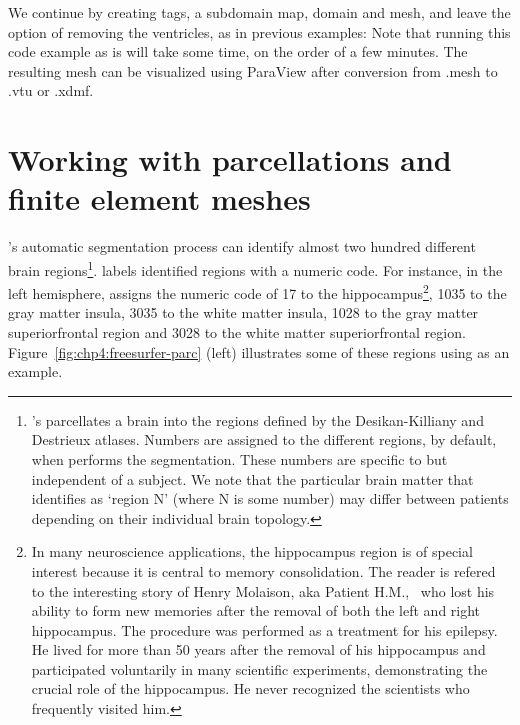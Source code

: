 We continue by creating tags, a subdomain map, domain and mesh, and
leave the option of removing the ventricles, as in previous examples:
 Note that
running this code example as is will take some time, on the order of a
few minutes. The resulting mesh can be visualized using ParaView
after conversion from .mesh to .vtu or .xdmf.

\section{Working with parcellations and finite element meshes} 
\label{sec:import-freesurfer-parcellation}
{\freesurfer}'s  automatic segmentation process can identify 
almost two hundred different brain regions\footnote{{\freesurfer}'s  parcellates a brain into the regions 
defined by the Desikan-Killiany and Destrieux atlases.  Numbers are assigned 
to the different regions, by default, when \freesurfer{} performs the 
segmentation. These numbers are specific to \freesurfer{} but independent of a 
subject.  We note that the particular brain matter that \freesurfer{} 
identifies as `region N' (where N is some number) may differ between patients 
depending on their individual brain topology.}.  {\freesurfer} labels 
identified regions with a numeric code.  For instance, in the left 
hemisphere, \freesurfer{} assigns the numeric code of 17 to the 
hippocampus\footnote{In many
  neuroscience applications, the hippocampus region is of special
  interest because it is central to memory consolidation. The reader
  is refered to the interesting story of Henry Molaison, aka Patient
  H.M.,~\cite{squire2009legacy, scoville1957loss} who lost his ability
  to form new memories after the removal of both the left and right
  hippocampus. The procedure was performed as a treatment for his
  epilepsy. He lived for more than 50 years after the removal of his
  hippocampus and participated voluntarily in many scientific
  experiments, demonstrating the crucial role of the hippocampus. He
  never recognized the scientists who frequently visited him.}, 1035
to the gray matter insula, 3035 to the white matter insula, 1028 to
the gray matter superiorfrontal region and 3028 to the white matter
superiorfrontal region. Figure~\ref{fig:chp4:freesurfer-parc} (left) illustrates 
some of these regions using  as an example. 
%
